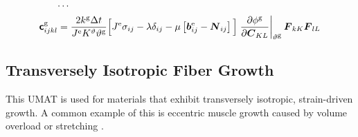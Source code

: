 \documentclass[10pt,letterpaper,oneside]{report}
\newcommand{\ten}[1]{\mbox{\boldmath $#1$}{}}
\newcommand{\tenf}[1]{\mbox{{\sffamily{\bfseries {#1}}}}}
\newcommand{\scas}[1]{\mbox{{\scriptsize{${\rm{#1}}$}}}{}}
\begin{document}
\begin{itemize}
\begin{align}
\cdots{}& \notag \\
\tenf{c}^{\scas{g}}_{ijkl} 
={}& \frac{2 k^{\scas{g}} \Delta t}{J^{\scas{e}} K^\vartheta \vartheta^{\scas{g}} } \Big[ J^{\scas{e}} \sigma_{ij} - \lambda \delta_{ij} - \mu \left[ \ten{b}^{\scas{e}}_{ij} - \ten{N}_{ij} \right] \Big] \left. \frac{\partial \phi^{\scas{g}} }{\partial \ten{C}_{KL}} \right|_{\vartheta^{\scas{g}}} \ten{F}_{kK} \ten{F}_{lL} 
\label{growth_tangent_area}
\end{align}



\subsection{Transversely Isotropic Fiber Growth}
This UMAT is used for materials that exhibit transversely isotropic, strain-driven growth.  A common example of this is eccentric muscle growth caused by volume overload \cite{Goktepe2010} or stretching \cite{Zollner2012}.


\end{itemize}
\end{document}
